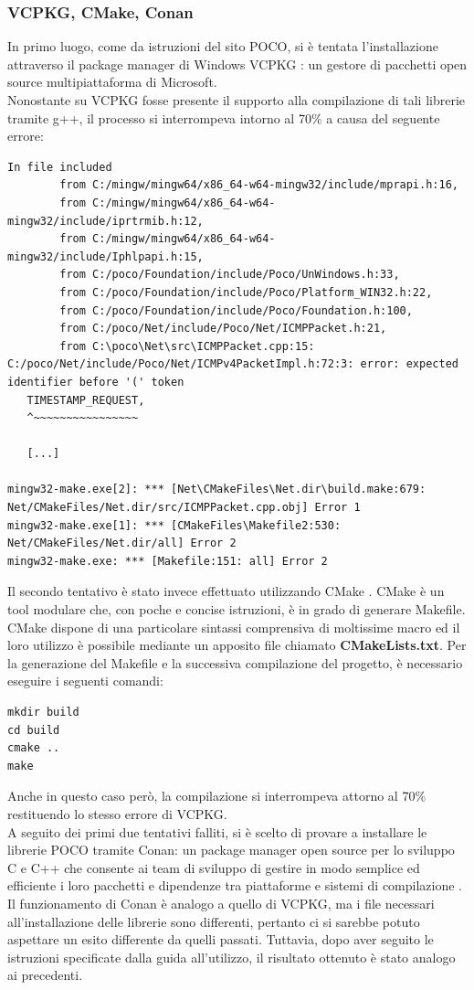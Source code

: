 \subsubsection{VCPKG, CMake, Conan}
In primo luogo, come da istruzioni del sito POCO, si è tentata l’installazione attraverso il package manager di Windows VCPKG \cite{VCPKG}: un gestore di pacchetti open source multipiattaforma di Microsoft. \\
Nonostante su VCPKG fosse presente il supporto alla compilazione di tali librerie tramite g++, il processo si interrompeva intorno al 70\% a causa del seguente errore:\\
\begin{verbatim}
In file included 
        from C:/mingw/mingw64/x86_64-w64-mingw32/include/mprapi.h:16,
        from C:/mingw/mingw64/x86_64-w64-mingw32/include/iprtrmib.h:12,
        from C:/mingw/mingw64/x86_64-w64-mingw32/include/Iphlpapi.h:15,
        from C:/poco/Foundation/include/Poco/UnWindows.h:33,
        from C:/poco/Foundation/include/Poco/Platform_WIN32.h:22,
        from C:/poco/Foundation/include/Poco/Foundation.h:100,
        from C:/poco/Net/include/Poco/Net/ICMPPacket.h:21,
        from C:\poco\Net\src\ICMPPacket.cpp:15:
C:/poco/Net/include/Poco/Net/ICMPv4PacketImpl.h:72:3: error: expected 
identifier before '(' token
   TIMESTAMP_REQUEST,
   ^~~~~~~~~~~~~~~~~
   
   [...]
   
mingw32-make.exe[2]: *** [Net\CMakeFiles\Net.dir\build.make:679:
Net/CMakeFiles/Net.dir/src/ICMPPacket.cpp.obj] Error 1
mingw32-make.exe[1]: *** [CMakeFiles\Makefile2:530: 
Net/CMakeFiles/Net.dir/all] Error 2
mingw32-make.exe: *** [Makefile:151: all] Error 2

\end{verbatim}
Il secondo tentativo è stato invece effettuato utilizzando CMake \cite{CMake}. CMake è un tool modulare che, con poche e concise istruzioni, è in grado di generare Makefile. CMake dispone di una particolare sintassi comprensiva di moltissime macro ed il loro utilizzo è possibile mediante un apposito file chiamato  \textbf{CMakeLists.txt}. Per la generazione del Makefile e la successiva compilazione del progetto, è necessario eseguire i seguenti comandi:
\begin{verbatim}
mkdir build
cd build
cmake ..
make
\end{verbatim}
Anche in questo caso però, la compilazione si interrompeva attorno al 70\% restituendo lo stesso errore di VCPKG.\\
A seguito dei primi due tentativi falliti, si è scelto di provare a installare le librerie POCO tramite Conan: un package manager open source per lo sviluppo C e C++ che consente ai team di sviluppo di gestire in modo semplice ed efficiente i loro pacchetti e dipendenze tra piattaforme e sistemi di compilazione \cite{Conan}. Il funzionamento di Conan è analogo a quello di VCPKG, ma i file necessari all’installazione delle librerie sono differenti, pertanto ci si sarebbe potuto aspettare un esito differente da quelli passati. Tuttavia, dopo aver seguito le istruzioni specificate dalla guida all'utilizzo, il risultato ottenuto è stato analogo ai precedenti.
